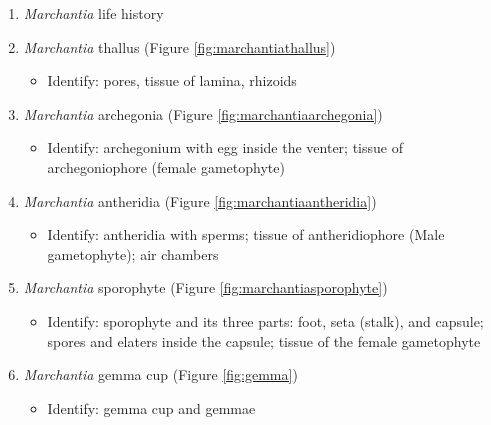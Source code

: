 \begin{enumerate}
\def\labelenumi{\arabic{enumi}.}
\tightlist
\item
  \emph{Marchantia} life history
\item
  \emph{Marchantia} thallus (Figure \ref{fig:marchantiathallus})

  \begin{itemize}
  \tightlist
  \item
    Identify: pores, tissue of lamina, rhizoids
  \end{itemize}
\item
  \emph{Marchantia} archegonia (Figure \ref{fig:marchantiaarchegonia})

  \begin{itemize}
  \tightlist
  \item
    Identify: archegonium with egg inside the venter; tissue of
    archegoniophore (female gametophyte)
  \end{itemize}
\item
  \emph{Marchantia} antheridia (Figure \ref{fig:marchantiaantheridia})

  \begin{itemize}
  \tightlist
  \item
    Identify: antheridia with sperms; tissue of antheridiophore (Male
    gametophyte); air chambers
  \end{itemize}
\item
  \emph{Marchantia} sporophyte (Figure \ref{fig:marchantiasporophyte})

  \begin{itemize}
  \tightlist
  \item
    Identify: sporophyte and its three parts: foot, seta (stalk), and
    capsule; spores and elaters inside the capsule; tissue of the female
    gametophyte
  \end{itemize}
\item
  \emph{Marchantia} gemma cup (Figure \ref{fig:gemma})

  \begin{itemize}
  \tightlist
  \item
    Identify: gemma cup and gemmae
  \end{itemize}
\end{enumerate}


